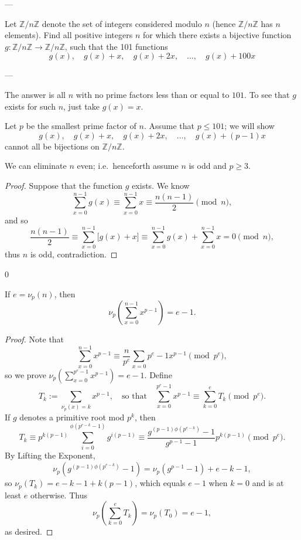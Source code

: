 
---

Let $\mathbb Z/n\mathbb Z$ denote the set of integers considered modulo $n$ (hence $\mathbb Z/n\mathbb Z$ has $n$ elements). Find all positive integers $n$ for which there exists a bijective function $g:\mathbb Z/n\mathbb Z\to\mathbb Z/n\mathbb Z$, such that the 101 functions \[g(x),\quad g(x)+x,\quad g(x)+2x,\quad\ldots,\quad g(x)+100x\]

---

The answer is all $n$ with no prime factors less than or equal to $101$. To see that $g$ exists for such $n$, just take $g(x)=x$.

Let $p$ be the smallest prime factor of $n$. Assume that $p\le101$; we will show \[g(x),\quad g(x)+x,\quad g(x)+2x,\quad\ldots,\quad g(x)+(p-1)x\]
cannot all be bijections on $\mathbb Z/n\mathbb Z$.
\begin{iclaim*}
    We can eliminate $n$ even; i.e.\ henceforth assume $n$ is odd and $p\ge3$.
\end{iclaim*}
\begin{proof}
    Suppose that the function $g$ exists. We know \[\sum_{x=0}^{n-1}g(x)\equiv\sum_{x=0}^{n-1}x\equiv\frac{n(n-1)}2\pmod n,\]
    and so \[\frac{n(n-1)}2\equiv\sum_{x=0}^{n-1}\Big[g(x)+x\Big]\equiv\sum_{x=0}^{n-1}g(x)+\sum_{x=0}^{n-1}x=0\pmod n,\]
    thus $n$ is odd, contradiction.
\end{proof}
\setcounter{boxlemma}0
\begin{boxlemma}
    If $e=\nu_p(n)$, then \[\nu_p\left(\sum_{x=0}^{n-1}x^{p-1}\right)=e-1.\]
\end{boxlemma}
\begin{proof}
    Note that \[\sum_{x=0}^{n-1}x^{p-1}\equiv\frac n{p^e}\sum_{x=0}{p^e-1}x^{p-1}\pmod{p^e},\]
    so we prove $\nu_p\left(\sum_{x=0}^{p^e-1}x^{p-1}\right)=e-1$. Define \[T_k:=\sum_{\nu_p(x)=k}x^{p-1},\quad\text{so that}\quad\sum_{x=0}^{p^e-1}x^{p-1}\equiv\sum_{k=0}^eT_k\pmod{p^e}.\]
    If $g$ denotes a primitive root mod $p^k$, then \[T_k\equiv p^{k(p-1)}\sum_{i=0}^{\phi(p^{e-k}-1)}g^{i(p-1)}\equiv\frac{g^{(p-1)\phi(p^{e-k})}-1}{g^{p-1}-1}p^{k(p-1)}\pmod{p^e}.\]
    By Lifting the Exponent, \[\nu_p\left(g^{(p-1)\phi(p^{e-k})}-1\right)=\nu_p\left(g^{p-1}-1\right)+e-k-1,\]
    so $\nu_p(T_k)=e-k-1+k(p-1)$, which equals $e-1$ when $k=0$ and is at least $e$ otherwise. Thus \[\nu_p\left(\sum_{k=0}^eT_k\right)=\nu_p(T_0)=e-1,\]
    as desired.
\end{proof}
